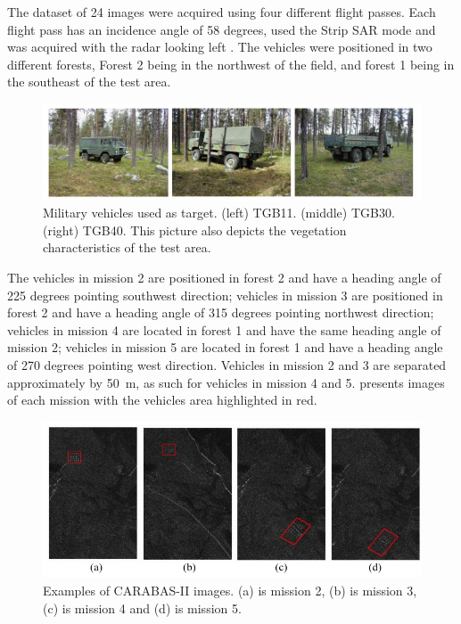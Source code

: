 The dataset of 24 images were acquired using four different flight passes. Each 
flight pass has an incidence angle of 58 degrees, used the Strip SAR mode and was acquired with the radar looking left \cite{ 75,76}.
The vehicles were positioned in two different forests, Forest 2 being in the northwest of the field, and forest 1 being in the
southeast of the test area. 

\begin{figure}[H]
    \centering
    \includegraphics{chapter6/carabas_vehicles_fisico.jpg}
    \caption{Military vehicles used as target. (left) TGB11. (middle) TGB30. (right) TGB40. 
    This picture also depicts the vegetation characteristics of the test area.}
    \label{fig:veiculos}
\end{figure}

The vehicles in mission 2 are positioned in forest 2 and have a heading angle of 225 degrees pointing southwest direction;
vehicles in mission 3 are positioned in forest 2 and have a heading angle of 315 degrees pointing northwest direction;
vehicles in mission 4 are located in forest 1 and have the same heading angle of mission 2;
vehicles in mission 5 are located in forest 1 and have a heading angle of 270 degrees pointing west direction.
Vehicles in mission 2 and 3 are separated approximately by 50 m, as such for vehicles in mission 4 and 5.
 presents images of each mission with the vehicles area highlighted in red.

\begin{figure}[H]
    \centering
    \includegraphics{chapter6/carabas_vehicles.jpg}
    \caption{Examples of CARABAS-II images. (a) is mission 2, (b) is mission 3, (c) is mission 4 and (d)
    is mission 5.}
    \label{fig:carabas_vehicles}
\end{figure}

